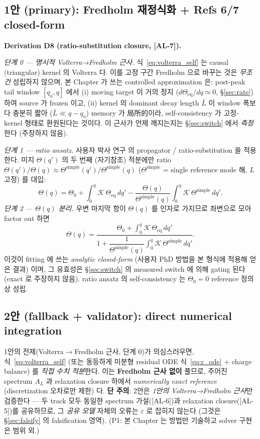\documentclass[11pt,a4paper]{article}
\newcommand{\eq}{\mathrm{eq}}
\newcommand{\simplecase}{\mathrm{simple}}
\newcommand{\AL}[1]{\textsf{[AL-#1]}}
\begin{document}
\subsection{1안 (primary): Fredholm 재정식화 + Refs 6/7 closed-form}\label{sec:track1}
\textbf{Derivation D8 (ratio-substitution closure, \AL{7}).}

\emph{단계 0 — 명시적 Volterra→Fredholm 근사.} 식~\eqref{eq:volterra_self} 는 causal
(triangular) kernel 의 Volterra 다. 이를 고정 구간 Fredholm 으로 바꾸는 것은 \emph{무조건}
성립하지 않으며, 본 Chapter 가 쓰는 controlled approximation 은: post-peak tail window
$[q_a,q]$ 에서 (i) moving target 이 거의 정지 ($d\Theta_\eq/dq\simeq0$, \S\ref{sec:rate})
하여 source 가 frozen 이고, (ii) kernel 의 dominant decay length $\bar L$ 이 window 폭보다
충분히 짧아 ($\bar L \ll q-q_a$) memory 가 局所的이라, self-consistency 가 고정-kernel
형태로 환원된다는 것이다. 이 근사가 언제 깨지는지는 \S\ref{sec:switch} 에서 \emph{측정}한다
(주장하지 않음).

\emph{단계 1 — ratio ansatz.} 사용자 박사 연구 \cite{lee2011,son2013} 의 propagator /
ratio-substitution 을 적용한다. 미지 $\Theta(q')$ 의 두 번째 (자기참조) 적분에만 ratio
$\Theta(q')/\Theta(q)\approx\Theta^{\simplecase}(q')/\Theta^{\simplecase}(q)$
($\Theta^{\simplecase}$ = single reference mode 해, $L$ 고정) 를 대입:
\begin{equation}
\Theta(q)=\Theta_0+\int_0^q\!\mathcal K\,\Theta_\eq\,dq'
-\frac{\Theta(q)}{\Theta^{\simplecase}(q)}\int_0^q\!\mathcal K\,\Theta^{\simplecase}\,dq'.
\label{eq:closed_pre}
\end{equation}
\emph{단계 2 — $\Theta(q)$ 분리.} 우변 마지막 항이 $\Theta(q)$ 를 인자로 가지므로 좌변으로
모아 factor out 하면
\begin{equation}
\boxed{\;\Theta(q)=\frac{\Theta_0+\displaystyle\int_0^q \mathcal K\,\Theta_\eq\,dq'}
{1+\dfrac{1}{\Theta^{\simplecase}(q)}\displaystyle\int_0^q \mathcal K\,\Theta^{\simplecase}\,dq'}.\;}
\label{eq:closed}
\end{equation}
이것이 fitting 에 쓰는 \emph{analytic closed-form} (사용자 PhD 방법을 본 형식에 적용해 얻은
결과) 이며, 그 유효성은 \S\ref{sec:switch} 의 measured switch 에 의해 gating 된다 (exact
로 주장하지 않음). ratio ansatz 의 self-consistency 는 $\Theta_0=0$ reference 정의상 성립.

\subsection{2안 (fallback + validator): direct numerical integration}\label{sec:track2}
1안의 전제(Volterra$\to$Fredholm 근사, 단계 0)가 의심스러우면, 식~\eqref{eq:volterra_self}
(또는 동등하게 미분형 residual ODE 식~\eqref{eq:r_ode} + charge balance) 를 \emph{직접 수치
적분}한다. 이는 \textbf{Fredholm 근사 없이} 풀므로, 주어진 spectrum $A_L$ 과 relaxation
closure 하에서 \emph{numerically exact reference} (discretization 오차로만 제한) 다.
\textbf{단 주의}: 2안은 \emph{1안의 Volterra→Fredholm 근사}만 검증한다 — 두 track 모두
동일한 spectrum 가설(\AL{6})과 relaxation closure(\AL{5})를 공유하므로, 그 \emph{공유 모델}
자체의 오류는 $\varepsilon$ 로 잡히지 않는다 (그것은 \S\ref{sec:falsify} 의 falsification
영역). (P1: 본 Chapter 는 방법만 기술하고 solver 구현은 범위 외.)
\end{document}
